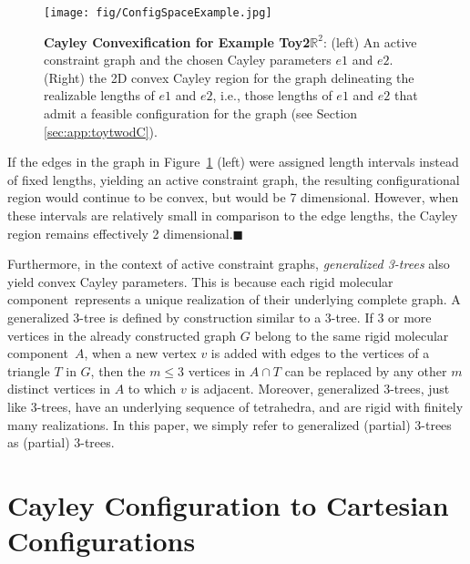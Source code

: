 \documentclass[]{article}
\newcommand{\figref}[1]{Figure~\ref{#1}}
\newcommand{\rmc}{rigid molecular component}
\newcommand{\toytwodtwo}{Toy2$\mathbb{R}^2$}
\begin{document}
\begin{figure}[htpb]
\begin{center}
\texttt{[image: fig/ConfigSpaceExample.jpg]}
\end{center}
\caption{\scriptsize \textbf{Cayley Convexification for Example {\toytwodtwo}}: (left) An
active constraint graph and the chosen Cayley parameters $e1$ and $e2$. 
(Right) the 2D convex Cayley region for the 
graph delineating the realizable lengths of $e1$ and $e2$, i.e., those lengths 
of $e1$ and $e2$ that admit a feasible configuration for the graph (see Section 
\ref{sec:app:toytwodC}).}
\label{fig:2DCayley}
\end{figure}

If the edges in the graph in \figref{fig:2DCayley} (left) were assigned length
intervals instead of fixed lengths, yielding an active constraint graph, the
resulting configurational region would continue to be convex, but would be 7
dimensional. However, when these intervals are relatively small in comparison
to the edge lengths, the Cayley region remains effectively 2
dimensional.\hfill$\blacksquare$

Furthermore, in the context of active constraint graphs, 
\emph{generalized 3-trees} also yield convex Cayley parameters. This is because
each \rmc\ represents a unique realization of their underlying complete
graph. A generalized 3-tree is defined by construction similar to a 3-tree.
If 3 or more vertices in the already
constructed graph $G$ belong to the same \rmc\ $A$, when a new vertex
$v$ is added with edges to the vertices of a triangle $T$ in $G$, then
the $m \le 3$ vertices in $A \cap T$ can be replaced by any other $m$ distinct
vertices in $A$ to which $v$ is adjacent.  Moreover, generalized 3-trees, just
like 3-trees, have an underlying sequence of tetrahedra, and are rigid with
finitely many realizations.  In this paper, we simply refer to generalized
(partial) 3-trees as (partial) 3-trees. 



\section{Cayley Configuration to Cartesian Configurations}
\label{sec:app:realization}
\end{document}
